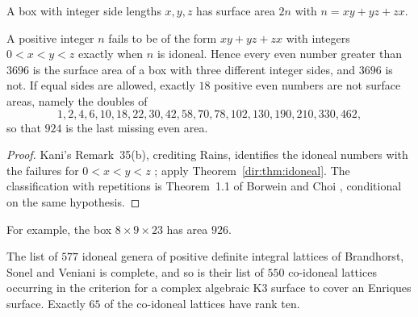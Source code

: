 A box with integer side lengths $x,y,z$ has surface area $2n$ with $n=xy+yz+zx$.

\begin{corollary}\label{dir:cor:boxes}
A positive integer $n$ fails to be of the form $xy+yz+zx$ with integers $0<x<y<z$
exactly when $n$ is idoneal. Hence every even number greater than $3696$ is the
surface area of a box with three different integer sides, and $3696$ is not. If equal
sides are allowed, exactly $18$ positive even numbers are not surface areas, namely the
doubles of
\[
 1,2,4,6,10,18,22,30,42,58,70,78,102,130,190,210,330,462 ,
\]
so that $924$ is the last missing even area.
\end{corollary}

\begin{proof}
Kani's Remark~35(b), crediting Rains, identifies the idoneal numbers with the failures
for $0<x<y<z$ \cite{Kani2011Idoneal}; apply Theorem~\ref{dir:thm:idoneal}. The classification
with repetitions is Theorem~1.1 of Borwein and Choi \cite{BorweinChoi2000Representations},
conditional on the same hypothesis.
\end{proof}

For example, the box $8\times9\times23$ has area $926$.

\begin{corollary}\label{dir:cor:k3}
The list of $577$ idoneal genera of positive definite integral lattices of
Brandhorst, Sonel and Veniani is complete, and so is their list of $550$ co-idoneal
lattices occurring in the criterion for a complex algebraic K3 surface to cover an
Enriques surface. Exactly $65$ of the co-idoneal lattices have rank ten.
\end{corollary}

